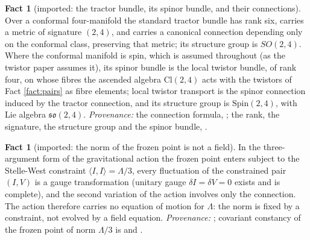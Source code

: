 \documentclass[11pt]{article}
\theoremstyle{definition}
\newtheorem{fact}[theorem]{Fact}
\newcommand{\Cl}{\mathrm{Cl}}
\newcommand{\ip}[2]{\langle #1, #2\rangle}
\begin{document}
\begin{fact}[imported: the tractor bundle, its spinor bundle, and their connections]\label{fact:tractor}
Over a conformal four-manifold the standard tractor bundle has rank six, carries a metric of signature $(2,4)$, and carries a canonical connection depending only on the conformal class, preserving that metric; its structure group is $SO(2,4)$. Where the conformal manifold is spin, which is assumed throughout (as the twistor paper assumes it), its spinor bundle is the local twistor bundle, of rank four, on whose fibres the ascended algebra $\Cl(2,4)$ acts with the twistors of Fact \ref{fact:pairs} as fibre elements; local twistor transport is the spinor connection induced by the tractor connection, and its structure group is $\mathrm{Spin}(2,4)$, with Lie algebra $\mathfrak{so}(2,4)$. \emph{Provenance:} the connection formula, \cite[Fact~4.1]{ButlerT6}; the rank, the signature, the structure group and the spinor bundle, \cite[Fact~4.9, Prop.~4.10]{ButlerT9}.
\end{fact}

\begin{fact}[imported: the norm of the frozen point is not a field]\label{fact:rigidity}
In the three-argument form of the gravitational action the frozen point enters subject to the Stelle-West constraint $\ip{I}{I} = \Lambda/3$, every fluctuation of the constrained pair $(I, V)$ is a gauge transformation (unitary gauge $\delta I = \delta V = 0$ exists and is complete), and the second variation of the action involves only the connection. The action therefore carries no equation of motion for $\Lambda$: the norm is fixed by a constraint, not evolved by a field equation. \emph{Provenance:} \cite[Prop.~5.4]{ButlerT10}; covariant constancy of the frozen point of norm $\Lambda/3$ is \cite[Prop.~4.2(i)]{ButlerT10} and \cite[Thms.~4.5, 4.7]{ButlerT6}.
\end{fact}
\end{document}
